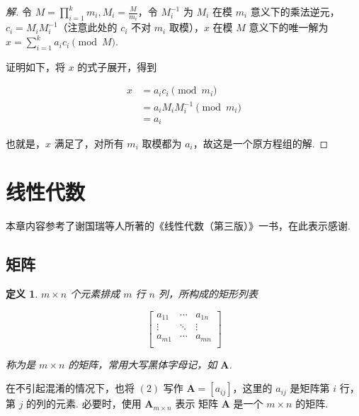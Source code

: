 \documentclass[a4paper]{article}
\newtheorem{definition}{定义}[section]
\begin{document}
\begin{proof}[解]
    令 $M=\prod\limits_{i=1}^k m_i,M_i=\frac{M}{m_i}$，令 $M_i^{-1}$ 为
    $M_i$ 在模 $m_i$ 意义下的乘法逆元，$c_i=M_iM_i^{-1}$（注意此处的 $c_i$ 不对 $m_i$
    取模），$x$ 在模 $M$ 意义下的唯一解为 $x=\sum\limits_{i=1}^k a_ic_i\pmod M$.

    证明如下，将 $x$ 的式子展开，得到

    \begin{equation*}
        \begin{split}
            x&=a_ic_i\pmod {m_i}\\
            &=a_iM_iM_i^{-1}\pmod {m_i}\\
            &=a_i
        \end{split}
    \end{equation*}

    也就是，$x$ 满足了，对所有 $m_i$ 取模都为 $a_i$，故这是一个原方程组的解.
\end{proof}

\section{线性代数}

本章内容参考了谢国瑞等人所著的《线性代数（第三版）》一书，在此表示感谢.

\subsection{矩阵}

\begin{definition}
    $m\times n$ 个元素排成 $m$ 行 $n$ 列，所构成的矩形列表

    \begin{equation}
        \begin{bmatrix}
            a_{11} & \cdots & a_{1n} \\
            \vdots & \ddots & \vdots \\
            a_{m1} & \cdots & a_{mn} \\
        \end{bmatrix}
    \end{equation}

    称为是 $m\times n$ 的矩阵，常用大写黑体字母记，如 $\boldsymbol A$.
\end{definition}

在不引起混淆的情况下，也将 $(2)$ 写作 $\boldsymbol A=[a_{ij}]$，这里的 $a_{ij}$
是矩阵第 $i$ 行，第 $j$ 的列的元素. 必要时，使用 $\boldsymbol A_{m\times n}$ 表示
矩阵 $\boldsymbol A$ 是一个 $m\times n$ 的矩阵.
\end{document}
